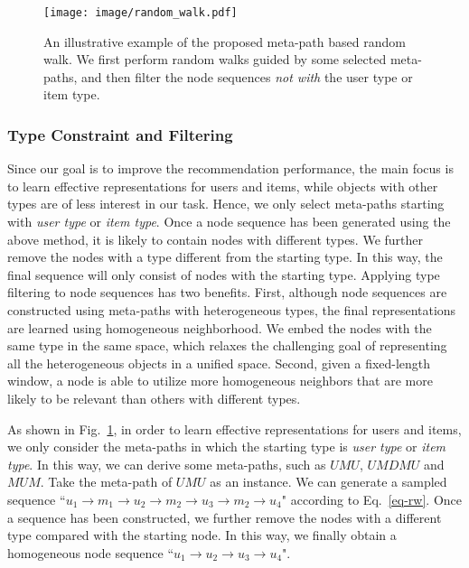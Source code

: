 \begin{figure}[t]%
\centering
\texttt{[image: image/random\_walk.pdf]}
\caption{\label{fig_randwalk}An illustrative example of the proposed meta-path based random walk. We first perform random walks guided by some selected meta-paths, and then filter the node sequences \emph{not with} the user type or item type.}
\end{figure}

\subsubsection{Type Constraint and Filtering}
Since our goal is to improve the recommendation performance, the main focus is to learn effective representations for users and items,
while objects with other types are of less interest in our task.
Hence, we only select meta-paths starting with \emph{user type} or \emph{item type}.
Once a node sequence has been generated using the above method, it is likely to contain nodes with different types.
We further remove the nodes with a type different from the starting type.
In this way, the final sequence will only consist of nodes with the starting type.
Applying type filtering to node sequences has two benefits. First, although node sequences are constructed using meta-paths with heterogeneous types, the final representations
are learned using homogeneous neighborhood. We embed the nodes with the same type in the same space, which relaxes the challenging goal of representing all the heterogeneous objects in a unified space.
Second, given a fixed-length window, a node is able to utilize more homogeneous neighbors that are more likely to be relevant than others with different types.

\begin{exmp}
As shown in Fig.~\ref{fig_randwalk}, in order to learn effective representations for users and items, we only consider the meta-paths in which the starting type is \emph{user type} or \emph{item type}. In this way, we can derive some meta-paths, such as $UMU$, $UMDMU$ and $MUM$.
 Take the meta-path of $UMU$ as an instance. We can generate a sampled sequence  ``$u_1 \rightarrow m_1 \rightarrow u_2 \rightarrow m_2 \rightarrow u_3 \rightarrow m_2 \rightarrow u_4$" according to Eq.~\ref{eq-rw}. Once a sequence has been constructed, we further remove the nodes with a different type compared with the starting node. In this way, we finally obtain a homogeneous node sequence ``$u_1 \rightarrow u_2 \rightarrow u_3 \rightarrow u_4$".
\end{exmp}

